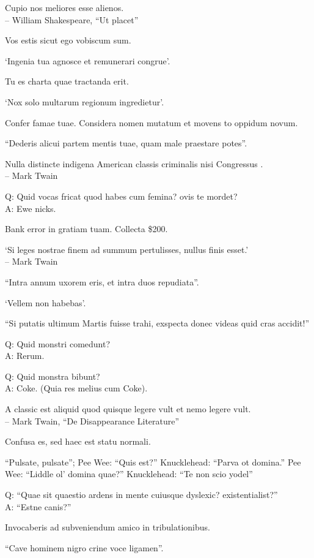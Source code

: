 \documentclass[titlepage,12pt]{memoir}
\begin{document}
 Cupio nos meliores esse alienos.
\\-- William Shakespeare, “Ut placet”

Vos estis sicut ego vobiscum sum.

‘Ingenia tua agnosce et remunerari congrue’.

Tu es charta quae tractanda erit.

‘Nox solo multarum regionum ingredietur’.

Confer famae tuae. Considera nomen mutatum et movens to
oppidum novum.

“Dederis alicui partem mentis tuae, quam male praestare potes”.

Nulla distincte indigena American classis criminalis nisi Congressus .
\\-- Mark Twain

Q: Quid vocas fricat quod habes cum femina?
ovis te mordet?\\
A: Ewe nicks.

Bank error in gratiam tuam. Collecta \$200.

‘Si leges nostrae finem ad summum pertulisses, nullus finis esset.’
\\-- Mark Twain

“Intra annum uxorem eris, et intra duos repudiata”.

‘Vellem non habebas’.

“Si putatis ultimum Martis fuisse trahi, exspecta donec videas quid cras accidit!”

Q: Quid monstri comedunt?\\
A: Rerum.

Q: Quid monstra bibunt?\\
A: Coke. (Quia res melius cum Coke).

A classic est aliquid quod quisque legere vult
et nemo legere vult.
\\-- Mark Twain, “De Disappearance Literature”

Confusa es, sed haec est statu normali.

“Pulsate, pulsate”;
Pee Wee: “Quis est?”
Knucklehead: “Parva ot domina.”
Pee Wee: “Liddle ol’ domina quae?”
Knucklehead: “Te non scio yodel”

Q: “Quae sit quaestio ardens in mente cuiusque dyslexic?
existentialist?”\\
A: “Estne canis?”

Invocaberis ad subveniendum amico in tribulationibus.

“Cave hominem nigro crine voce ligamen”.
\end{document}
